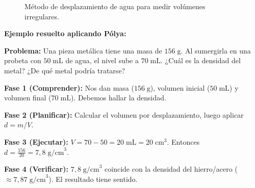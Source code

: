 \documentclass[12pt, letterpaper]{article}
\begin{document}
\begin{figure}[h!]
  \caption{Método de desplazamiento de agua para medir volúmenes irregulares.}
  \label{fig:arquimedes}
\end{figure}

\noindent\textbf{Ejemplo resuelto aplicando Pólya:}

\textbf{Problema:} Una pieza metálica tiene una masa de $156\;\text{g}$. Al sumergirla en una probeta con $50\;\text{mL}$ de agua, el nivel sube a $70\;\text{mL}$. ¿Cuál es la densidad del metal? ¿De qué metal podría tratarse?

\begin{cuadrosolucion}
  \textbf{Fase 1 (Comprender):} Nos dan masa ($156\;\text{g}$), volumen inicial ($50\;\text{mL}$) y volumen final ($70\;\text{mL}$). Debemos hallar la densidad.

  \textbf{Fase 2 (Planificar):} Calcular el volumen por desplazamiento, luego aplicar $d = m/V$.

  \textbf{Fase 3 (Ejecutar):} $V = 70 - 50 = 20\;\text{mL} = 20\;\text{cm}^3$. Entonces $d = \frac{156}{20} = 7{,}8\;\text{g/cm}^3$.

  \textbf{Fase 4 (Verificar):} $7{,}8\;\text{g/cm}^3$ coincide con la densidad del hierro/acero ($\approx 7{,}87\;\text{g/cm}^3$). El resultado tiene sentido.
\end{cuadrosolucion}
\end{document}
